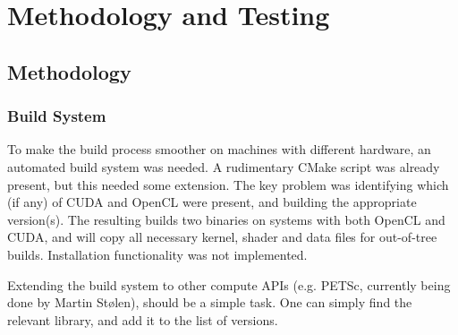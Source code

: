 \chapter{Methodology and Testing}
\section{Methodology}
\subsection{Build System}
To make the build process smoother on machines with different hardware, an automated build system was needed. A rudimentary CMake script was already present, but this needed some extension. The key problem was identifying which (if any) of CUDA and OpenCL were present, and building the appropriate version(s). The resulting builds two binaries on systems with both OpenCL and CUDA, and will copy all necessary kernel, shader and data files for out-of-tree builds. Installation functionality was not implemented.

Extending the build system to other compute APIs (e.g. PETSc, currently being done by Martin Stølen), should be a simple task. One can simply find the relevant library, and add it to the list of versions.

